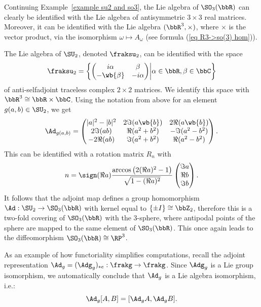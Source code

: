\begin{example}\label{example Lie algebras of so3 and su2}
    Continuing Example~\ref{example su2 and so3}, 
    the Lie algebra of $\SO_3(\bbR)$ can clearly be identified with the Lie algebra of antisymmetric $3\times 3$ real matrices. Moreover, it can be identified with the Lie algebra $(\bbR^3,\times)$, where $\times$ is the vector product, via the isomorphism $\omega\mapsto A_{\omega}$ (see formula (\ref{eq R3->so(3) hom})). 
    
    The Lie algebra of $\SU_2$, denoted $\fraksu_2$, can be identified with the space
    \[\fraksu_2=\left\{
    \begin{pmatrix}
        i\alpha&\beta\\-\wb{\beta}&-i\alpha
    \end{pmatrix}
    \middle| \alpha\in\bbR,\beta\in\bbC
    \right\}\]
    of anti-selfadjoint traceless complex $2\times 2$ matrices. We identify this space with $\bbR^3\cong \bbR\times \bbC$. Using the notation from above for an element $g(a,b)\in\SU_2$, we get
    \[\Ad_{g(a,b)}=
    \begin{pmatrix}
        |a|^2-|b|^2&2\Im (a\wb{b}) & 2\Re(a\wb{b}) \\
        2\Im(ab) & \Re(a^2+b^2) & -\Im(a^2-b^2)\\
        -2\Re(ab) & \Im(a^2+b^2) & \Re(a^2-b^2)
    \end{pmatrix}.\label{eq Ad: su2->so3}
    \]
    This can be identified with a rotation matrix $R_n$ with
    \[n=\sign(\Re a)\frac{\arccos\left(2(\Re a)^2-1\right)}{\sqrt{1-(\Re a)^2}}
    \begin{pmatrix}
        \Im a\\ \Re b \\ \Im b
    \end{pmatrix}.
    \]
    It follows that the adjoint map defines a group homomorphism $\Ad:\SU_2\to \SO_3(\bbR)$ with kernel equal to $\{\pm I\}\cong \bbZ_2$, therefore this is a two-fold covering of $\SO_3(\bbR)$ with the 3-sphere, where antipodal points of the sphere are mapped to the same element of $\SO_3(\bbR)$. This once again leads to the diffeomorphism $\SO_3(\bbR)\cong \RP^3$.
\end{example}



\begin{example}
    As an example of how functoriality simplifies computations, recall the adjoint representation $\Ad_g=(\Adg_g)_{\ast e}:\frakg\to \frakg$. Since $\Adg_g$ is a Lie group isomorphism, we automatically conclude that $\Ad_g$ is a Lie algebra isomorphism, i.e.:
    \[\Ad_g[A,B]=[\Ad_g A,\Ad_g B].\]
\end{example}

